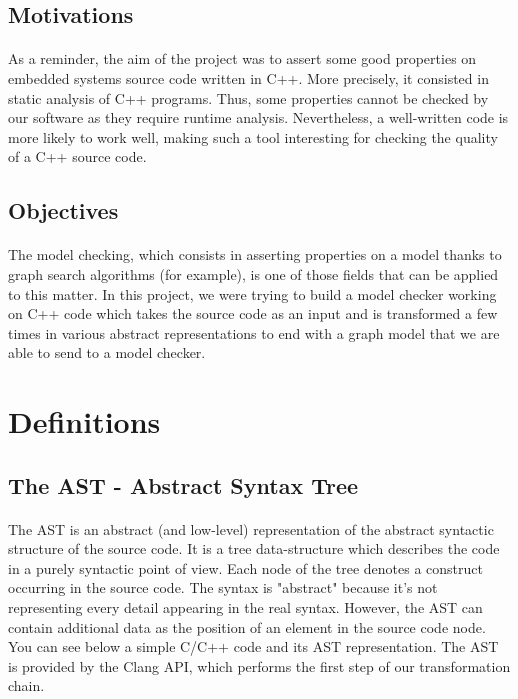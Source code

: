 \documentclass{report}
\begin{document}
\subsection{Motivations}

\paragraph{}
\hspace{4mm}As a reminder, the aim of the project was to assert some good properties on embedded systems source code written in C++. More precisely,
it consisted in static analysis of C++ programs. Thus, some properties cannot be checked by our software as they require runtime analysis.
Nevertheless, a well-written code is more likely to work well, making such a tool interesting for checking the quality of a C++ source code.

\subsection{Objectives}

\paragraph{}
\hspace{4mm}The model checking, which consists in asserting properties 
on a model thanks to graph search algorithms (for example),
 is one of those fields that can be applied to this matter.
 In this project, we were trying to build a model checker working
 on C++ code which takes the source code as an input and is 
transformed a few times in various abstract representations to end 
with a graph model that we are able to send to a model checker.

\section{Definitions}

\subsection{The AST - Abstract Syntax Tree}

\paragraph{}
\hspace{4mm}The \textsc{AST} is an abstract (and low-level) representation of the 
abstract  syntactic structure of the source code.
It is a tree data-structure which describes the code in a purely 
syntactic point of view. Each node of the tree denotes a
 construct occurring in the source code. The syntax is "abstract" 
because it's not representing  every detail appearing in the real syntax. 
However, the \textsc{AST} can contain additional data as the position of 
an element in the source code node.
You can see below a
 simple \textsc{C/C++} code and its AST representation. 
The \textsc{AST} is provided by the Clang API, which performs the first step
 of our transformation chain.
\end{document}
